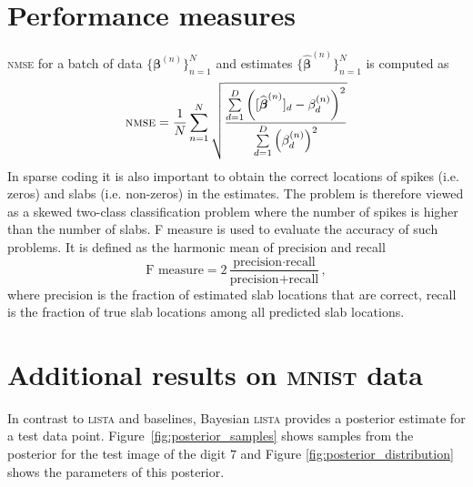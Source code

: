 \documentclass{article}
\begin{document}
\section{Performance measures}
\textsc{nmse} for a batch of data $\{\boldsymbol\beta^{(n)}\}_{n=1}^{N}$ and estimates $\{\widehat{\boldsymbol\beta}^{(n)}\}_{n=1}^{N}$ is computed as
\begin{equation}
\text{\textsc{nmse}} = \frac{1}{N}\sum\limits_{n=1}^N\sqrt{\frac{\sum\limits_{d=1}^D\left([\widehat{\boldsymbol\beta}^{(n)}]_{d} - \beta_d^{(n)}\right)^2}{\sum\limits_{d=1}^D\left(\beta_{d}^{(n)}\right)^2}}
\end{equation}
In sparse coding it is also important to obtain the correct locations of spikes (i.e. zeros) and slabs (i.e. non-zeros) in the estimates. The problem is therefore viewed as a skewed two-class classification problem where the number of spikes is higher than the number of slabs. F measure is used to evaluate the accuracy of such problems. It is defined as the harmonic mean of precision and recall
\begin{equation}
\text{F measure} = 2\dfrac{\text{precision}\cdot\text{recall}}{\text{precision} + \text{recall}},
\end{equation}
where precision is the fraction of estimated slab locations that are correct, recall is the fraction of true slab locations among all predicted slab locations.

\section{Additional results on \textsc{mnist} data}
In contrast to \textsc{lista} and baselines, Bayesian \textsc{lista} provides a posterior estimate for a test data point. Figure~\ref{fig:posterior_samples} shows samples from the posterior for the test image of the digit $7$ and Figure \ref{fig:posterior_distribution} shows the parameters of this posterior.
\end{document}
